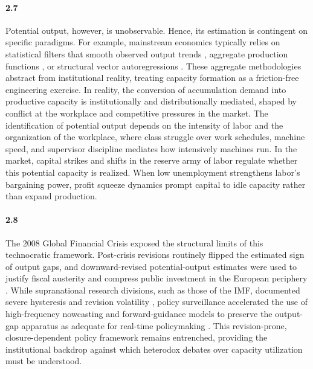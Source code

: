 \paragraph{2.7}
Potential output, however, is unobservable. Hence, its estimation is contingent on specific paradigms. For example, mainstream economics typically relies on statistical filters that smooth observed output trends \citep{HodrickPrescott1997, BaxterKing1999, BeveridgeNelson1981, Hamilton2018}, aggregate production functions \citep{CBO2004PotentialGDP, Alichi2015}, or structural vector autoregressions \citep{BlanchardQuah1989}. These aggregate methodologies abstract from institutional reality, treating capacity formation as a friction-free engineering exercise. In reality, the conversion of accumulation demand into productive capacity is institutionally and distributionally mediated, shaped by conflict at the workplace and competitive pressures in the market. The identification of potential output depends on the intensity of labor and the organization of the workplace, where class struggle over work schedules, machine speed, and supervisor discipline mediates how intensively machines run. In the market, capital strikes and shifts in the reserve army of labor regulate whether this potential capacity is realized. When low unemployment strengthens labor's bargaining power, profit squeeze dynamics prompt capital to idle capacity rather than expand production.

\paragraph{2.8}
The 2008 Global Financial Crisis exposed the structural limits of this technocratic framework. Post-crisis revisions routinely flipped the estimated sign of output gaps, and downward-revised potential-output estimates were used to justify fiscal austerity and compress public investment in the European periphery \citep{Heimberger2017, Heimberger2020}. While supranational research divisions, such as those of the IMF, documented severe hysteresis and revision volatility \citep{CerraSaxena2017, CerraFatasSaxena2023}, policy surveillance accelerated the use of high-frequency nowcasting and forward-guidance models to preserve the output-gap apparatus as adequate for real-time policymaking \citep{AastveitTrovik2014, Foster2024}. This revision-prone, closure-dependent policy framework remains entrenched, providing the institutional backdrop against which heterodox debates over capacity utilization must be understood.

